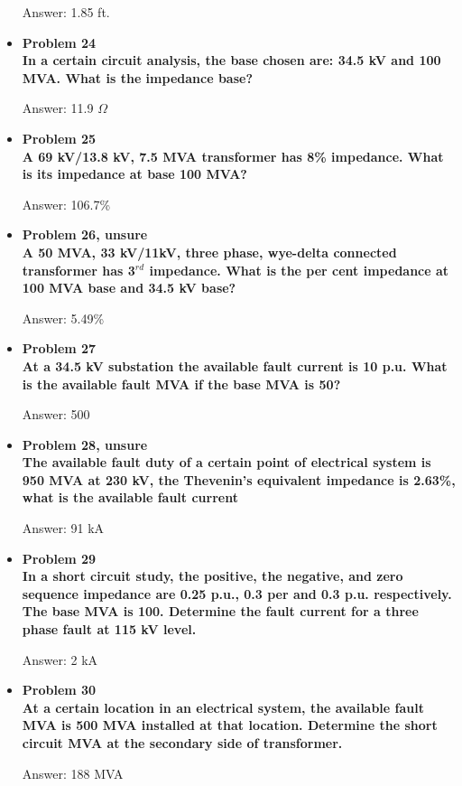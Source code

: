 \documentclass{article}
\begin{document}
\begin{center}
\begin{itemize}
    Answer: 1.85 ft.

    \item\textbf{Problem 24\\
    In a certain circuit analysis, the base chosen are: 34.5 kV and 100 MVA. What is the impedance base?}

    Answer: 11.9 $\Omega$

    \item\textbf{Problem 25\\
    A 69 kV/13.8 kV, 7.5 MVA transformer has 8\% impedance. What is its impedance at base 100 MVA?}    

    Answer: 106.7\%

    \item\textbf{Problem 26, unsure\\
    A 50 MVA, 33 kV/11kV, three phase, wye-delta connected transformer has 3$^{rd}$ impedance. What is the per cent impedance at 100 MVA base and 34.5 kV base?}

    Answer: 5.49\%

    \item\textbf{Problem 27\\
    At a 34.5 kV substation the available fault current is 10 p.u. What is the available fault MVA if the base MVA is 50?}

    Answer: 500

    \item\textbf{Problem 28, unsure\\
    The available fault duty of a certain point of electrical system is 950 MVA at 230 kV, the Thevenin's equivalent impedance is 2.63\%, what is the available fault current}

    Answer: 91 kA

    \item\textbf{Problem 29\\
    In a short circuit study, the positive, the negative, and zero sequence impedance are 0.25 p.u., 0.3 per  and 0.3 p.u. respectively. The base MVA is 100. Determine the fault current for a three phase fault at 115 kV level.}

    Answer: 2 kA

    \item\textbf{Problem 30\\
    At a certain location in an electrical system, the available fault MVA is 500 MVA installed at that location. Determine the short circuit MVA at the secondary side of transformer.}

    Answer: 188 MVA


\end{itemize}
\end{center}
\end{document}
